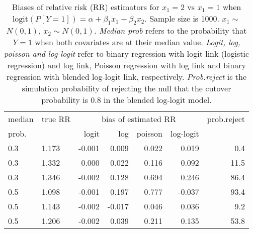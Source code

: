 \documentclass[12pt,a4paper]{article}
\begin{document}
\begin{table}[H] 
\small\sf\centering 
\caption{Biases of relative risk (RR) estimators for $x_1=2$ vs $x_1=1$ when $\mbox{logit}(P[Y=1])=\alpha+\beta_1 x_1 + \beta_2 x_2$. Sample size is 1000. $x_1 \sim $$N(0,1)$, $x_2 \sim N(0,1)$. {\it Median prob} refers to the probability that $Y=1$ when both covariates are at their median value. {\it Logit, log, poisson and log-logit} refer to binary regression with logit link (logistic regression) and log link, Poisson regression with log link and binary regression with blended log-logit link, respectively. {\it Prob.reject} is the simulation probability of rejecting the null that the cutover probability is $0.8$ in the blended log-logit model.} 
\begin{tabular}{llrrrrr} 
\toprule 
median & true RR & \multicolumn{4}{c}{bias of estimated RR} & prob.reject \\ 
prob. & & logit & log & poisson & log-logit  & \\ \midrule 
0.3 & 1.173 & -0.001 &  0.009 & 0.022 &  0.019 &  0.4 \\  
0.3 & 1.332 &  0.000 &  0.022 & 0.116 &  0.092 & 11.5 \\  
0.3 & 1.346 & -0.002 &  0.128 & 0.694 &  0.246 & 86.4 \\  
0.5 & 1.098 & -0.001 &  0.197 & 0.777 & -0.037 & 93.4 \\  
0.5 & 1.143 & -0.002 & -0.017 & 0.046 &  0.036 &  9.2 \\  
0.5 & 1.206 & -0.002 &  0.039 & 0.211 &  0.135 & 53.8 \\  
\bottomrule 
\end{tabular} 
\end{table} 
\end{document}
